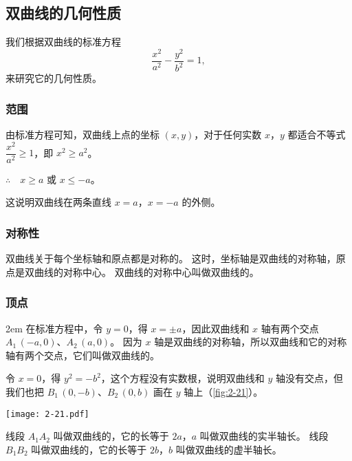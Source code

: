 \subsection{双曲线的几何性质}
我们根据双曲线的标准方程
\[ \frac{x^2}{a^2}-\frac{y^2}{b^2}=1,\]
来研究它的几何性质。
\subsubsection{范围}
由标准方程可知，双曲线上点的坐标 $(x,y)$，对于任何实数 $x$，$y$ 都适合不等式 $\dfrac{x^2}{a^2} \geqslant 1$，即 $x^2 \geqslant a^2$。

$\therefore \quad x \geqslant a$ 或 $x \leqslant -a$。

这说明双曲线在两条直线 $x=a$，$x=-a$ 的外侧。

\subsubsection{对称性}
双曲线关于每个坐标轴和原点都是对称的。
这时，坐标轴是双曲线的对称轴，原点是双曲线的对称中心。
双曲线的对称中心叫做双曲线的。

\subsubsection{顶点}
\noindent
\begin{minipage}{0.6\linewidth}\parindent2em
在标准方程中，令 $y=0$，得 $x=\pm a$，因此双曲线和 $x$ 轴有两个交点 $A_1\,(-a,0)$、$A_2\,(a,0)$。
因为 $x$ 轴是双曲线的对称轴，所以双曲线和它的对称轴有两个交点，它们叫做双曲线的。

令 $x=0$，得 $y^2=-b^2$，这个方程没有实数根，说明双曲线和 $y$ 轴没有交点，但我们也把 $B_1\,(0,-b)$、$B_2\,(0,b)$ 画在 $y$ 轴上（\cref{fig:2-21}）。
\end{minipage}\hfill
\begin{minipage}{0.35\linewidth}\centering
\begin{figurehere}
  \texttt{[image: 2-21.pdf]}
  \caption{}\label{fig:2-21}
\end{figurehere}
\end{minipage}

\medskip
线段 $A_1A_2$ 叫做双曲线的，它的长等于 $2a$，$a$ 叫做双曲线的实半轴长。
线段 $B_1B_2$ 叫做双曲线的，它的长等于 $2b$，$b$ 叫做双曲线的虚半轴长。

